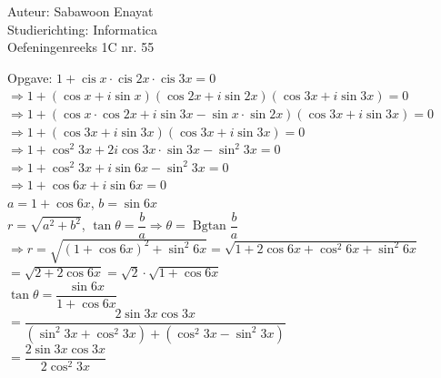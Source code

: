 \documentclass[a4paper]{article}
\begin{document}
  
\noindent \large Auteur: Sabawoon Enayat \\
\noindent \large Studierichting: Informatica\\
\noindent \large Oefeningenreeks 1C nr. 55 \\

\newcommand{\Bgtan}{\operatorname{Bgtan}}
\newcommand{\Bgcos}{\operatorname{Bgcos}}
\newcommand{\Bgcot}{\operatorname{Bgcot}}
\newcommand{\cis}{\operatorname{cis}}

\medskip

\normalsize

Opgave: $1 + \cis x \cdot \cis 2x \cdot \cis 3x = 0$\\

$\Rightarrow 1 + (\cos x + i \sin x) (\cos 2x + i \sin 2x) (\cos 3x + i \sin 3x) = 0$\\

$\Rightarrow 1 + (\cos x \cdot \cos 2x + i \sin 3x - \sin x \cdot \sin 2x) (\cos 3x + i \sin 3x) = 0$\\

$\Rightarrow 1 + (\cos 3x + i \sin 3x) (\cos 3x + i \sin 3x) = 0$\\

$\Rightarrow 1 + \cos^2 3x + 2i \cos 3x \cdot \sin 3x - \sin^2 3x = 0$\\

$\Rightarrow 1 + \cos^2 3x + i \sin 6x - \sin^2 3x = 0$\\

$\Rightarrow 1 + \cos 6x + i \sin 6x = 0$\\

$a = 1 + \cos 6x$, $b = \sin 6x$\\

$r = \sqrt{a^2 + b^2}$, $\tan \theta = \dfrac{b}{a} \Rightarrow \theta = \Bgtan \dfrac{b}{a}$\\

$\Rightarrow r =\sqrt{(1 + \cos 6x)^2 + \sin^2 6x} = \sqrt{1 + 2 \cos 6x + \cos^2 6x + \sin^2 6x}$\\

$= \sqrt{2 + 2 \cos 6x} = \sqrt{2} \cdot \sqrt{1 + \cos 6x}$\\

$\tan \theta = \dfrac{\sin 6x}{1 + \cos 6x}$\\

$= \dfrac{2 \sin 3x \cos 3x}{(\sin^2 3x + \cos^2 3x) + (\cos^2 3x - \sin^2 3x)}$\\

$= \dfrac{2 \sin 3x \cos 3x}{2\cos^2 3x}$\\
\end{document}

